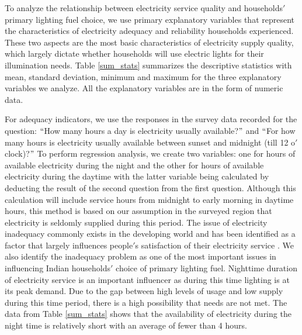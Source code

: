 \documentclass[11pt,english]{article}
\theoremstyle{plain} \newtheorem{claim}{Claim}
\theoremstyle{plain} \newtheorem{prop}{Proposition}
\theoremstyle{plain} \newtheorem{hypo}{Hypothesis}
\begin{document}
To analyze the relationship between electricity service quality and households$'$ primary lighting fuel choice, we use primary explanatory variables that represent the characteristics of electricity adequacy and reliability households experienced. These two aspects are the most basic characteristics of electricity supply quality, which largely dictate whether households will use electric lights for their illumination needs. Table \ref{sum_stats} summarizes the descriptive statistics with mean, standard deviation, minimum and maximum for the three explanatory variables we analyze. All the explanatory variables are in the form of numeric data.

For adequacy indicators, we use the responses in the survey data recorded for the question: $``$How many hours a day is electricity usually available?$"$ and $``$For how many hours is electricity usually available between sunset and midnight (till 12 o$'$clock)?$"$ To perform regression analysis, we create two variables: one for hours of available electricity during the night and the other for hours of available electricity during the daytime with the latter variable being calculated by deducting the result of the second question from the first question. Although this calculation will include service hours from midnight to early morning in daytime hours, this method is based on our assumption in the surveyed region that electricity is seldomly supplied during this period. The issue of electricity inadequacy commonly exists in the developing world and has been identified as a factor that largely influences people$'$s satisfaction of their electricity service \citep{DugouaUrpelainen2014, BakkerLachs2004}. We also identify the inadequacy problem as one of the most important issues in influencing Indian households$'$ choice of primary lighting fuel. Nighttime duration of electricity service is an important influencer as during this time lighting is at its peak demand. Due to the gap between high levels of usage and low supply during this time period, there is a high possibility that needs are not met. The data from Table \ref{sum_stats} shows that the availability of electricity during the night time is relatively short with an average of fewer than 4 hours.
\end{document}
